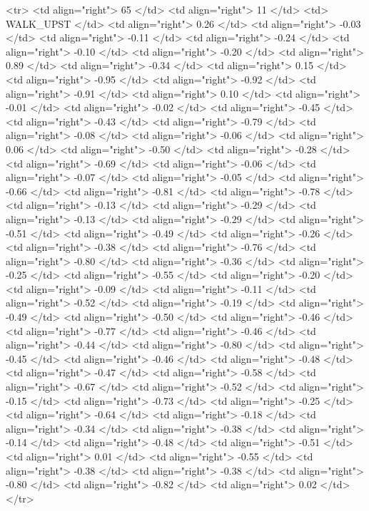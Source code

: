   <tr> <td align="right"> 65 </td> <td align="right">  11 </td> <td> WALK_UPST </td> <td align="right"> 0.26 </td> <td align="right"> -0.03 </td> <td align="right"> -0.11 </td> <td align="right"> -0.24 </td> <td align="right"> -0.10 </td> <td align="right"> -0.20 </td> <td align="right"> 0.89 </td> <td align="right"> -0.34 </td> <td align="right"> 0.15 </td> <td align="right"> -0.95 </td> <td align="right"> -0.92 </td> <td align="right"> -0.91 </td> <td align="right"> 0.10 </td> <td align="right"> -0.01 </td> <td align="right"> -0.02 </td> <td align="right"> -0.45 </td> <td align="right"> -0.43 </td> <td align="right"> -0.79 </td> <td align="right"> -0.08 </td> <td align="right"> -0.06 </td> <td align="right"> 0.06 </td> <td align="right"> -0.50 </td> <td align="right"> -0.28 </td> <td align="right"> -0.69 </td> <td align="right"> -0.06 </td> <td align="right"> -0.07 </td> <td align="right"> -0.05 </td> <td align="right"> -0.66 </td> <td align="right"> -0.81 </td> <td align="right"> -0.78 </td> <td align="right"> -0.13 </td> <td align="right"> -0.29 </td> <td align="right"> -0.13 </td> <td align="right"> -0.29 </td> <td align="right"> -0.51 </td> <td align="right"> -0.49 </td> <td align="right"> -0.26 </td> <td align="right"> -0.38 </td> <td align="right"> -0.76 </td> <td align="right"> -0.80 </td> <td align="right"> -0.36 </td> <td align="right"> -0.25 </td> <td align="right"> -0.55 </td> <td align="right"> -0.20 </td> <td align="right"> -0.09 </td> <td align="right"> -0.11 </td> <td align="right"> -0.52 </td> <td align="right"> -0.19 </td> <td align="right"> -0.49 </td> <td align="right"> -0.50 </td> <td align="right"> -0.46 </td> <td align="right"> -0.77 </td> <td align="right"> -0.46 </td> <td align="right"> -0.44 </td> <td align="right"> -0.80 </td> <td align="right"> -0.45 </td> <td align="right"> -0.46 </td> <td align="right"> -0.48 </td> <td align="right"> -0.47 </td> <td align="right"> -0.58 </td> <td align="right"> -0.67 </td> <td align="right"> -0.52 </td> <td align="right"> -0.15 </td> <td align="right"> -0.73 </td> <td align="right"> -0.25 </td> <td align="right"> -0.64 </td> <td align="right"> -0.18 </td> <td align="right"> -0.34 </td> <td align="right"> -0.38 </td> <td align="right"> -0.14 </td> <td align="right"> -0.48 </td> <td align="right"> -0.51 </td> <td align="right"> 0.01 </td> <td align="right"> -0.55 </td> <td align="right"> -0.38 </td> <td align="right"> -0.38 </td> <td align="right"> -0.80 </td> <td align="right"> -0.82 </td> <td align="right"> 0.02 </td> </tr>
